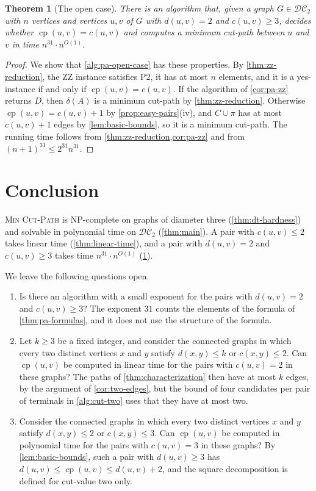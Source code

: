 \documentclass[pdflatex,sn-mathphys-num]{sn-jnl}%
\theoremstyle{thmstyleone}%
\newtheorem{theorem}{Theorem}%
\theoremstyle{thmstyletwo}%
\theoremstyle{thmstylethree}%
\newcommand{\cp}{\operatorname{cp}}%
\newcommand{\DC}{\mathcal{DC}_2}%
\newcommand{\MinCutPath}{\textsc{Min Cut-Path}}%
\begin{document}
\begin{theorem}[The open case]
\label{thm:pa-open-case}
There is an algorithm that, given a graph $G \in \DC$ with $n$ vertices and vertices $u, v$ of $G$ with $d(u, v) = 2$ and $c(u, v) \geq 3$, decides whether $\cp(u, v) = c(u, v)$ and computes a minimum cut-path between $u$ and $v$ in time $n^{31} \cdot n^{O(1)}$.
\end{theorem}

\begin{proof}
We show that \cref{alg:pa-open-case} has these properties.
By \cref{thm:zz-reduction}, the ZZ instance satisfies P2, it has at most $n$ elements, and it is a yes-instance if and only if $\cp(u, v) = c(u, v)$.
If the algorithm of \cref{cor:pa-zz} returns $D$, then $\delta(A)$ is a minimum cut-path by \cref{thm:zz-reduction}.
Otherwise $\cp(u, v) = c(u, v) + 1$ by \cref{prop:easy-pairs}(iv), and $C \cup \pi$ has at most $c(u, v) + 1$ edges by \cref{lem:basic-bounds}, so it is a minimum cut-path.
The running time follows from \cref{thm:zz-reduction,cor:pa-zz} and from $(n + 1)^{31} \leq 2^{31} n^{31}$.
\end{proof}

\section{Conclusion}\label{sec:conclusion}

\MinCutPath{} is NP-complete on graphs of diameter three (\cref{thm:dt-hardness}) and solvable in polynomial time on $\DC$ (\cref{thm:main}).
A pair with $c(u, v) \leq 2$ takes linear time (\cref{thm:linear-time}), and a pair with $d(u, v) = 2$ and $c(u, v) \geq 3$ takes time $n^{31} \cdot n^{O(1)}$ (\cref{thm:pa-open-case}).

We leave the following questions open.
\begin{enumerate}
\item Is there an algorithm with a small exponent for the pairs with $d(u, v) = 2$ and $c(u, v) \geq 3$?
The exponent $31$ counts the elements of the formula of \cref{thm:pa-formulas}, and it does not use the structure of the formula.

\item Let $k \geq 3$ be a fixed integer, and consider the connected graphs in which every two distinct vertices $x$ and $y$ satisfy $d(x, y) \leq k$ or $c(x, y) \leq 2$.
Can $\cp(u, v)$ be computed in linear time for the pairs with $c(u, v) = 2$ in these graphs?
The paths of \cref{thm:characterization} then have at most $k$ edges, by the argument of \cref{cor:two-edges}, but the bound of four candidates per pair of terminals in \cref{alg:cut-two} uses that they have at most two.

\item Consider the connected graphs in which every two distinct vertices $x$ and $y$ satisfy $d(x, y) \leq 2$ or $c(x, y) \leq 3$.
Can $\cp(u, v)$ be computed in polynomial time for the pairs with $c(u, v) = 3$ in these graphs?
By \cref{lem:basic-bounds}, such a pair with $d(u, v) \geq 3$ has $d(u, v) \leq \cp(u, v) \leq d(u, v) + 2$, and the square decomposition is defined for cut-value two only.
\end{enumerate}
\end{document}
